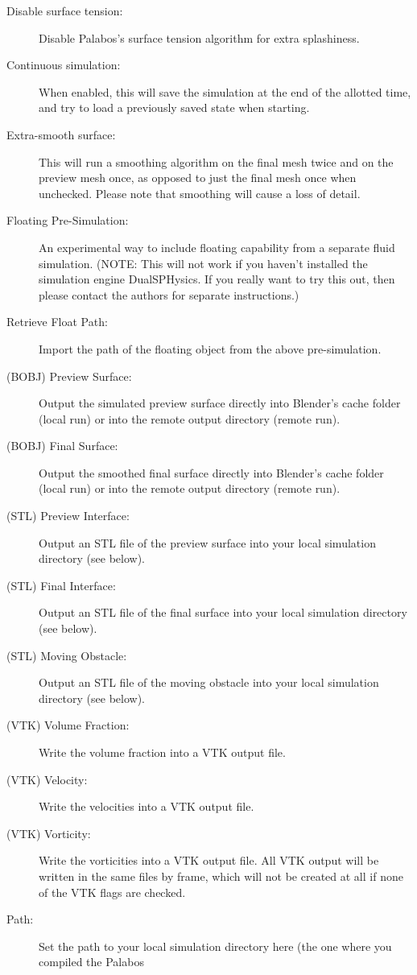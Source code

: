 \documentclass[12pt]{article}
\begin{document}
\begin{description}
\item[Disable surface tension:] Disable Palabos's surface tension algorithm for extra splashiness.
\item[Continuous simulation:] When enabled, this will save the simulation at the end of the allotted time, 
and try to load a previously saved state when starting.
\item[Extra-smooth surface:] This will run a smoothing algorithm on the final mesh twice and on the preview 
mesh once, as opposed to just the final mesh once when unchecked. Please note that smoothing will cause a 
loss of detail.
\item[Floating Pre-Simulation:] An experimental way to include floating capability from a separate fluid 
simulation. (NOTE: This will not work if you haven't installed the simulation engine DualSPHysics. If you 
really want to try this out, then please contact the authors for separate instructions.)
\item[Retrieve Float Path:] Import the path of the floating object from the above pre-simulation.
\item[(BOBJ) Preview Surface:] Output the simulated preview surface directly into Blender's cache folder 
(local run) or into the remote output directory (remote run).
\item[(BOBJ) Final Surface:] Output the smoothed final surface directly into Blender's cache folder (local 
run) or into the remote output directory (remote run).
\item[(STL) Preview Interface:] Output an STL file of the preview surface into your local simulation 
directory (see below).
\item[(STL) Final Interface:] Output an STL file of the final surface into your local simulation directory 
(see below).
\item[(STL) Moving Obstacle:] Output an STL file of the moving obstacle into your local simulation directory 
(see below).
\item[(VTK) Volume Fraction:] Write the volume fraction into a VTK output file.
\item[(VTK) Velocity:] Write the velocities into a VTK output file.
\item[(VTK) Vorticity:] Write the vorticities into a VTK output file. All VTK output will be written in the 
same files by frame, which will not be created at all if none of the VTK flags are checked.
\item[Path:] Set the path to your local simulation directory here (the one where you compiled the Palabos 

\end{description}
\end{document}
